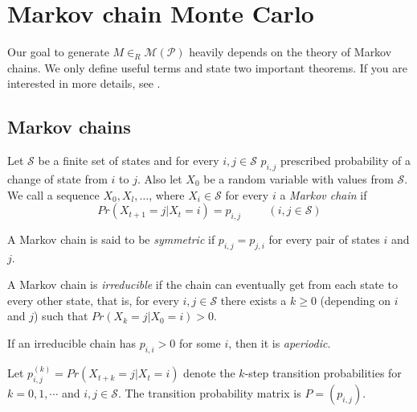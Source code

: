 \chapter{Markov chain Monte Carlo}
\label{chap:mcmc}
Our goal to generate $M\in_R\mathcal{M}(\mathcal{P})$ heavily depends on the theory of Markov chains. We only define useful terms and state two important theorems. If you are interested in more details, see \cite{Madras}.

\section{Markov chains}
\begin{defn}
Let $\mathcal{S}$ be a finite set of states and for every $i,j\in\mathcal{S}$ $p_{i,j}$ prescribed probability of a change of state from $i$ to $j$. Also let $X_0$ be a random variable with values from $\mathcal{S}$. We call a sequence $X_0,X_l,\dots$, where $X_i\in\mathcal{S}$ for every $i$ a \emph{Markov chain} if
$$Pr(X_{t+1}=j|X_t=i)=p_{i,j} \hspace{1cm} (i,j\in\mathcal{S})$$
\end{defn}
\begin{defn}
A Markov chain is said to be \emph{symmetric} if $p_{i,j}=p_{j,i}$ for every pair of states $i$ and $j$.
\end{defn}
\begin{defn}
A Markov chain is \emph{irreducible} if the chain can eventually get from each state to every other state, that is, for every $i,j\in\mathcal{S}$ there exists a $k\geq0$ (depending on $i$ and $j$) such that $Pr(X_k=j|X_0=i)>0$.
\end{defn}
\begin{defn}
If an irreducible chain has $p_{i,i}>0$ for some $i$, then it is \emph{aperiodic}.
\end{defn}
Let $p_{i,j}^{(k)}=Pr(X_{t+k}=j|X_t=i)$ denote the $k$-step transition probabilities for $k=0,1,\cdots$ and $i,j\in\mathcal{S}$. The transition probability matrix is $P=(p_{i,j})$.

